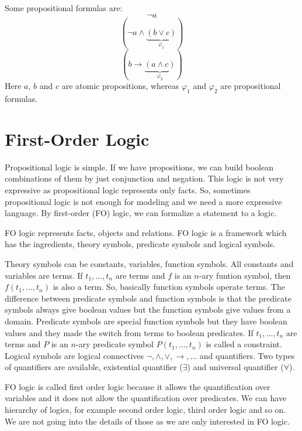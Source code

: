 \begin{example}
	Some propositional formulas are:
	$$\neg \mathit{a}$$
	$$ ( \neg \mathit{a} \wedge \underbrace{ ( \mathit{b} \vee \mathit{c} ) }\limits_{\mathit{\varphi_{1}}} ) $$
	$$ ( \mathit{b} \to \underbrace{ ( \mathit{a} \wedge \mathit{c} ) }\limits_{\mathit{\varphi_{2}}} ) $$
	Here  $\mathit{a}$, $\mathit{b}$ and $\mathit{c}$ are atomic propositions, whereas $\mathit{\varphi_{1}}$ and $\mathit{\varphi_{2}}$ are propositional formulas.
\end{example}
\section{First-Order Logic}
\label{sec:FOLogic}
Propositional logic is simple. 
If we have propositions, we can build boolean combinations of them by just conjunction and negation.
This logic is not very expressive as propositional logic represents only facts.
So, sometimes propositional logic is not enough for modeling and we need a more expressive language.
By first-order (FO) logic, we can formalize a statement to a logic.\newline

\noindent FO logic represents facts, objects and relations.
FO logic is a framework which has the ingredients, theory symbols, predicate symbols and logical symbols.\newline

\noindent Theory symbols can be constants, variables, function symbols.
All constants and variables are terms.
If $t_{1}, \ldots, t_{n}$ are terms and $f$ is an $n$-ary funtion symbol, then $f(t_{1}, \ldots, t_{n})$ is also a term.
So, basically function symbols operate terms.
The difference between predicate symbols and function symbols is that the predicate symbols always give boolean values but the function symbols give values from a domain.
Predicate symbols are special function symbols but they have boolean values and they made the switch from terms to boolean predicates.
If $t_{1}, \ldots, t_{n}$ are terms and $P$ is an $n$-ary predicate symbol $P(t_{1}, \ldots, t_{n})$ is called a constraint.
Logical symbols are logical connectives $\neg, \wedge, \vee, \to, \ldots$ and quantifiers.
Two types of quantifiers are available, existential quantifier ($\exists$) and universal quantifier ($\forall$).\newline

\noindent FO logic is called first order logic because it allows the quantification over variables and it does not allow the quantification over predicates.
We can have hierarchy of logics, for example second order logic, third order logic and so on.
We are not going into the details of those as we are only interested in FO logic.\newline


